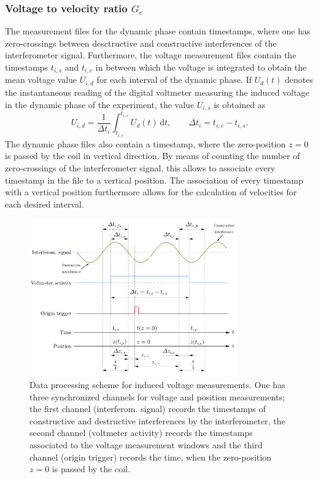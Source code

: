 \documentclass{report}
\numberwithin{tm}{section}
\begin{document}
\subsubsection{Voltage to velocity ratio $G_e$}
The measurement files for the dynamic phase contain timestamps, where one has zero-crossings between desctructive and constructive interferences of the interferometer signal. Furthermore, the voltage measurement files contain the timestamps $t_{i,s}$ and $t_{i,e}$ in between which the voltage is integrated to obtain the mean voltage value $U_{i,d}$ for each interval of the dynamic phase. If $U_{d}(t)$ denotes the instantaneous reading of the digital voltmeter measuring the induced voltage in the dynamic phase of the experiment, the value $U_{i,s}$ is obtained as \begin{equation}
	U_{i,d} = \frac{1}{\Delta t_i}\int_{t_{i,s}}^{t_{i,e}}U_{d}(t)\,\mathrm{d}t, \qquad \Delta t_i = t_{i,e}-t_{i,s}.
\end{equation} The dynamic phase files also contain a timestamp, where the zero-position $z=0$ is passed by the coil in vertical direction. By means of counting the number of zero-crossings of the interferometer signal, this allows to associate every timestamp in the file to a vertical position. The association of every timestamp with a vertical position furthermore allows for the calculation of velocities for each desired interval.
\begin{figure}[h]
	\centering
	\includegraphics[width=0.8\textwidth]{figures/dataprocessing.pdf}
	\caption{Data processing scheme for induced voltage measurements. One has three synchronized channels for voltage and position measurements; the first channel (interferom. signal) records the timestamps of constructive and destructive interferences by the interferometer, the second channel (voltmeter activity) records the timestamps associated to the voltage measurement windows and the third channel (origin trigger) records the time, when the zero-position $z=0$ is passed by the coil.}
	 \label{fig:dataprocessing}
\end{figure}
\end{document}
